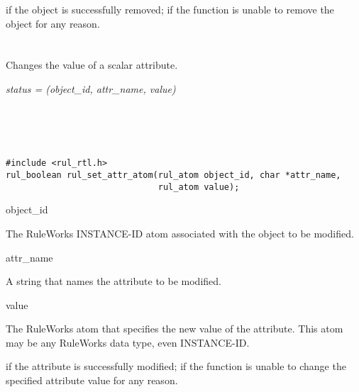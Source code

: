 \ReturnValue

 if the object is successfully removed;  if the function is
unable to remove the object for any reason.

\begin{seealso}

\end{seealso}

\section*{}

Changes the value of a scalar attribute.

\Syntax

\it{status} = (\it{object\_id},
\it{attr\_name}, \it{value})

\begin{args}
   \\
   \\
   \\
\end{args}

\CBinding
\begin{verbatim}
#include <rul_rtl.h>
rul_boolean rul_set_attr_atom(rul_atom object_id, char *attr_name,
                              rul_atom value);
\end{verbatim}

\begin{arguments}
\item[object\_id]

  The RuleWorks INSTANCE-ID atom associated with the object to be
  modified.

\item[attr\_name]

  A string that names the attribute to be modified.

\item[value]

  The RuleWorks atom that specifies the new value of the
  attribute. This atom may be any RuleWorks data type, even
  INSTANCE-ID.
\end{arguments}

\ReturnValue

 if the attribute is successfully modified;  if the
function is unable to change the specified attribute value for any
reason.

